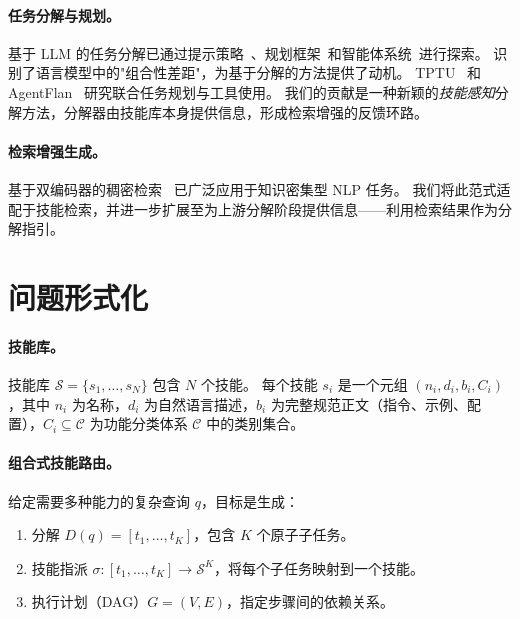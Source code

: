 \documentclass[11pt,a4paper]{ctexart}
\begin{document}
\paragraph{任务分解与规划。}
基于 LLM 的任务分解已通过提示策略~\citep{wei2022chain,zhou2022least,khot2023decomposed}、规划框架~\citep{huang2022language,wang2023plan}和智能体系统~\citep{yao2023react,shinn2023reflexion}进行探索。
\citet{press2023measuring} 识别了语言模型中的"组合性差距"，为基于分解的方法提供了动机。
TPTU~\citep{ruan2024tptu} 和 AgentFlan~\citep{chen2024agentflan} 研究联合任务规划与工具使用。
我们的贡献是一种新颖的\emph{技能感知}分解方法，分解器由技能库本身提供信息，形成检索增强的反馈环路。

\paragraph{检索增强生成。}
基于双编码器的稠密检索~\citep{karpukhin2020dense,ni2022sentence} 已广泛应用于知识密集型 NLP 任务。
我们将此范式适配于技能检索，并进一步扩展至为上游分解阶段提供信息——利用检索结果作为分解指引。

\section{问题形式化}
\label{sec:problem}

\paragraph{技能库。}
技能库 $\mathcal{S} = \{s_1, \ldots, s_N\}$ 包含 $N$ 个技能。
每个技能 $s_i$ 是一个元组 $(n_i, d_i, b_i, C_i)$，其中 $n_i$ 为名称，$d_i$ 为自然语言描述，$b_i$ 为完整规范正文（指令、示例、配置），$C_i \subseteq \mathcal{C}$ 为功能分类体系 $\mathcal{C}$ 中的类别集合。

\paragraph{组合式技能路由。}
给定需要多种能力的复杂查询 $q$，目标是生成：
\begin{enumerate}[nosep,leftmargin=*]
  \item 分解 $D(q) = [t_1, \ldots, t_K]$，包含 $K$ 个原子子任务。
  \item 技能指派 $\sigma: [t_1, \ldots, t_K] \to \mathcal{S}^K$，将每个子任务映射到一个技能。
  \item 执行计划（DAG）$G = (V, E)$，指定步骤间的依赖关系。
\end{enumerate}
\end{document}
